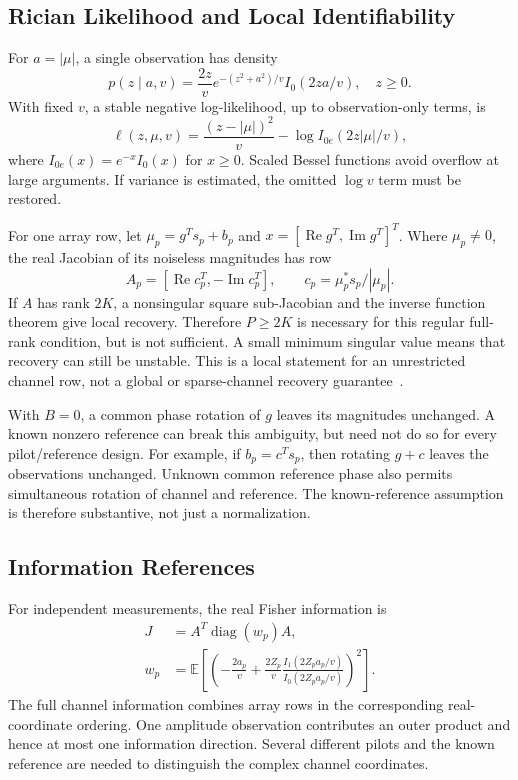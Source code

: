 \documentclass[10pt,journal,letterpaper]{IEEEtran}
\DeclareMathOperator{\diag}{diag}
\begin{document}
\subsection{Rician Likelihood and Local Identifiability}
For $a=|\mu|$, a single observation has density
\begin{equation}
 p(z\mid a,v)=\frac{2z}{v}e^{-(z^2+a^2)/v}I_0(2za/v),\quad z\ge0.
\end{equation}
With fixed $v$, a stable negative log-likelihood, up to observation-only terms, is
\begin{equation}
 \ell(z,\mu,v)=\frac{(z-|\mu|)^2}{v}-\log I_{0e}(2z|\mu|/v),
 \label{eq:loss}
\end{equation}
where $I_{0e}(x)=e^{-x}I_0(x)$ for $x\ge0$. Scaled Bessel functions avoid overflow at large arguments. If variance is estimated, the omitted $\log v$ term must be restored.

For one array row, let $\mu_p=g^Ts_p+b_p$ and $x=[\operatorname{Re}g^T,\operatorname{Im}g^T]^T$. Where $\mu_p\ne0$, the real Jacobian of its noiseless magnitudes has row
\begin{equation}
 A_p=[\operatorname{Re}c_p^T,-\operatorname{Im}c_p^T],\qquad
 c_p=\mu_p^*s_p/|\mu_p|.
 \label{eq:jacobian}
\end{equation}
If $A$ has rank $2K$, a nonsingular square sub-Jacobian and the inverse function theorem give local recovery. Therefore $P\ge2K$ is necessary for this regular full-rank condition, but is not sufficient. A small minimum singular value means that recovery can still be unstable. This is a local statement for an unrestricted channel row, not a global or sparse-channel recovery guarantee~\cite{gao2018}.

With $B=0$, a common phase rotation of $g$ leaves its magnitudes unchanged. A known nonzero reference can break this ambiguity, but need not do so for every pilot/reference design. For example, if $b_p=c^Ts_p$, then rotating $g+c$ leaves the observations unchanged. Unknown common reference phase also permits simultaneous rotation of channel and reference. The known-reference assumption is therefore substantive, not just a normalization.

\subsection{Information References}
For independent measurements, the real Fisher information is
\begin{align}
 J&=A^T\diag(w_p)A,\nonumber\\
 w_p&=\mathbb E\!\left[\left(-\frac{2a_p}{v}+\frac{2Z_p}{v}
 \frac{I_1(2Z_pa_p/v)}{I_0(2Z_pa_p/v)}\right)^2\right].
 \label{eq:fisher}
\end{align}
The full channel information combines array rows in the corresponding real-coordinate ordering. One amplitude observation contributes an outer product and hence at most one information direction. Several different pilots and the known reference are needed to distinguish the complex channel coordinates.
\end{document}
